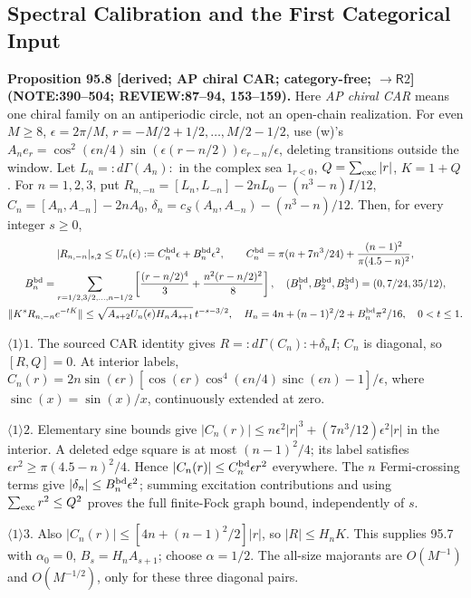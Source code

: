 \subsection{Spectral Calibration and the First Categorical Input}
\textbf{Proposition 95.8 [derived; AP chiral CAR; category-free; \(\to\mathsf R2\)]\newline (NOTE:390--504; REVIEW:87--94, 153--159).}
Here \emph{AP chiral CAR} means one chiral family on an antiperiodic circle, not an open-chain realization.
For even \(M\ge8\), \(\epsilon=2\pi/M\), \(r=-M/2+1/2,\ldots,M/2-1/2\), use (w)'s
\(A_ne_r=\cos^2(\epsilon n/4)\sin(\epsilon(r-n/2))e_{r-n}/\epsilon\), deleting transitions outside the window.
Let \(L_n={:}d\Gamma(A_n){:}\) in the complex sea \(1_{r<0}\), \(Q=\sum_{\rm exc}|r|\), \(K=1+Q\).
For \(n=1,2,3\), put \(R_{n,-n}=[L_n,L_{-n}]-2nL_0-(n^3-n)I/12\),
\(C_n=[A_n,A_{-n}]-2nA_0\), \(\delta_n=c_S(A_n,A_{-n})-(n^3-n)/12\). Then, for every integer \(s\ge0\),
\begin{gather*}
 |R_{n,-n}|_{s,2}\le U_n(\epsilon):=C_n^{\rm bd}\epsilon+B_n^{\rm bd}\epsilon^2,\qquad
 C_n^{\rm bd}=\pi(n+7n^3/24)+\frac{(n-1)^2}{\pi(4.5-n)^2},\\
 B_n^{\rm bd}=\sum_{r=1/2,3/2,\ldots,n-1/2}\left[\frac{(r-n/2)^4}{3}+\frac{n^2(r-n/2)^2}{8}\right],
 \quad(B_1^{\rm bd},B_2^{\rm bd},B_3^{\rm bd})=(0,7/24,35/12),\\
 \|K^sR_{n,-n}e^{-tK}\|\le\sqrt{A_{s+2}U_n(\epsilon)H_nA_{s+1}}\,t^{-s-3/2},\quad
 H_n=4n+(n-1)^2/2+B_n^{\rm bd}\pi^2/16,\quad0<t\le1.
\end{gather*}
\par\(\langle1\rangle1\). The sourced CAR identity gives \(R={:}d\Gamma(C_n){:}+\delta_nI\); \(C_n\) is diagonal,
so \([R,Q]=0\). At interior labels,
\(C_n(r)=2n\sin(\epsilon r)[\cos(\epsilon r)\cos^4(\epsilon n/4)\operatorname{sinc}(\epsilon n)-1]/\epsilon\),
where \(\operatorname{sinc}(x)=\sin(x)/x\), continuously extended at zero.
\par\(\langle1\rangle2\). Elementary sine bounds give \(|C_n(r)|\le n\epsilon^2|r|^3+(7n^3/12)\epsilon^2|r|\)
in the interior. A deleted edge square is at most \((n-1)^2/4\); its label satisfies
\(\epsilon r^2\ge\pi(4.5-n)^2/4\). Hence \(|C_n(r)|\le C_n^{\rm bd}\epsilon r^2\) everywhere.
The \(n\) Fermi-crossing terms give \(|\delta_n|\le B_n^{\rm bd}\epsilon^2\); summing excitation contributions
and using \(\sum_{\rm exc}r^2\le Q^2\) proves the full finite-Fock graph bound, independently of \(s\).
\par\(\langle1\rangle3\). Also \(|C_n(r)|\le[4n+(n-1)^2/2]|r|\), so \(|R|\le H_nK\).
This supplies 95.7 with \(\alpha_0=0\), \(B_s=H_nA_{s+1}\); choose \(\alpha=1/2\).
The all-size majorants are \(O(M^{-1})\) and \(O(M^{-1/2})\), only for these three diagonal pairs.

